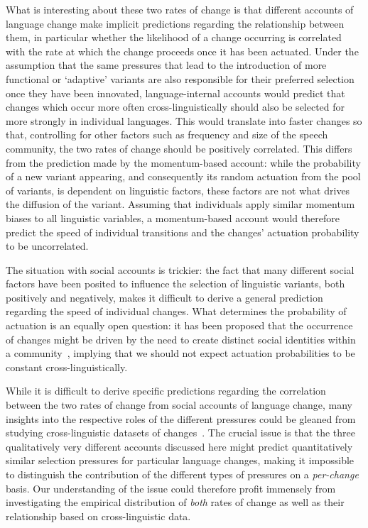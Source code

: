 What is interesting about these two rates of change is that different accounts of language change make implicit predictions regarding the relationship between them, in particular whether the likelihood of a change occurring is correlated with the rate at which the change proceeds once it has been actuated. Under the assumption that the same pressures that lead to the introduction of more functional or `adaptive' variants are also responsible for their preferred selection once they have been innovated, language-internal accounts would predict that changes which occur more often cross-linguistically should also be selected for more strongly in individual languages. This would translate into faster changes so that, controlling for other factors such as frequency and size of the speech community, the two rates of change should be positively correlated. %
This differs from the prediction made by the momentum-based account: while the probability of a new variant appearing, and consequently its random actuation from the pool of variants, is dependent on linguistic factors, these factors are not what drives the diffusion of the variant. Assuming that individuals apply similar momentum biases to all linguistic variables, a momentum-based account would therefore predict the speed of individual transitions and the changes' actuation probability to be uncorrelated.

The situation with social accounts is trickier: 
the fact that many different social factors have been posited to influence the selection of linguistic variants, both positively and negatively, makes it difficult to derive a general prediction regarding the speed of individual changes. What determines the probability of actuation is an equally open question: it has been proposed that the occurrence of changes might be driven by the need to create distinct social identities within a community~\citep{Labov2002,Matthews2012,Roberts2013}, implying that we should not expect actuation probabilities to be constant cross-linguistically.

While it is difficult to derive specific predictions regarding the correlation between the two rates of change from social accounts of language change, many insights into the respective roles of the different pressures could be gleaned from studying cross-linguistic datasets of changes~\citep[see also][]{Bickel2015}. The crucial issue is that the three qualitatively very different accounts discussed here might predict quantitatively similar selection pressures for particular language changes, making it impossible to distinguish the contribution of the different types of pressures on a \emph{per-change} basis. Our understanding of the issue could therefore profit immensely from investigating the empirical distribution of \emph{both} rates of change as well as their relationship based on cross-linguistic data.

